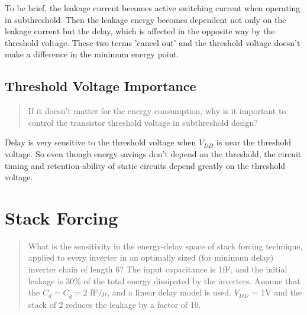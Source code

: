 \documentclass[11pt]{article}
\begin{document}
To be brief, the leakage current becomes active switching current when operating in subthreshold. Then the leakage energy becomes dependent not only on the leakage current but the delay, which is affected in the opposite way by the threshold voltage. These two terms 'cancel out' and the threshold voltage doesn't make a difference in the minimum energy point.

\subsection{Threshold Voltage Importance}
\begin{quote}
	If it doesn't matter for the energy consumption, why is it important to control the transistor threshold voltage in subthreshold design?
\end{quote}

Delay is very sensitive to the threshold voltage when $V_{DD}$ is near the threshold voltage. So even though energy savings don't depend on the threshold, the circuit timing and retention-ability of static circuits depend greatly on the threshold voltage.

\section{Stack Forcing}
\begin{quote}
	What is the sensitivity in the energy-delay space of stack forcing technique, applied to every inverter in an optimally sized (for minimum delay) inverter chain of length 6? The input capacitance is 1fF, and the initial leakage is 30\% of the total energy dissipated by the inverters. Assume that the $C_{d} = C_{g} = 2$ fF$/\mu$, and a linear delay model is used. $V_{DD}$ = 1V and the stack of 2 reduces the leakage by a factor of 10.
\end{quote}
\newpage
\appendix
\end{document}
